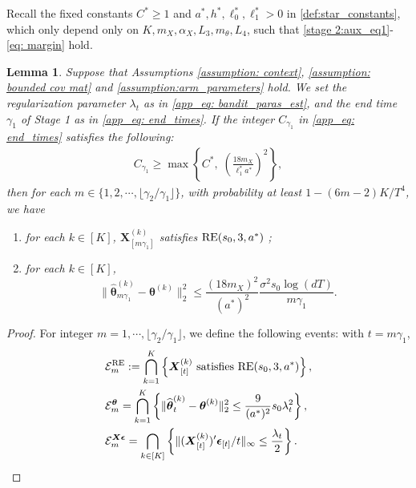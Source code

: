 \documentclass[aos,preprint]{imsart}
\theoremstyle{plain}
\newtheorem{lemma}[theorem]{Lemma}
\theoremstyle{definition}
\newcommand{\btheta}{\boldsymbol{\theta}}
\newcommand{\bd}[1]{\boldsymbol{#1}}
\newcommand{\hbtheta}{\widehat{\boldsymbol{\theta}}}
\newcommand{\bX}{\boldsymbol{X}}
\newcommand{\mE}{\mathcal{E}}
\newcommand{\bepsilon}{\bd{\epsilon}}
\begin{document}
\begin{appendix}
Recall the fixed constants  $C^* \geq 1$ and $a^*, h^*, \ell_0^*, \ell_1^* > 0$  in \eqref{def:star_constants}, which only depend only on $K,  m_X, \alpha_X,  L_3, m_{\theta}, L_4$, such that \eqref{stage 2:aux_eq1}-\eqref{eq: margin} hold.

\begin{lemma} \label{lemma: RE and estimation error of stage 2}
Suppose that Assumptions \ref{assumption: context}, \ref{assumption: bounded cov mat} and \ref{assumption:arm_parameters} hold. We set the regularization parameter $\lambda_t$ as in \eqref{app_eq: bandit_paras_est}, and the end time $\gamma_1$ of Stage 1 as in \eqref{app_eq: end_times}.
If the integer $C_{\gamma_1}$ in \eqref{app_eq: end_times} satisfies the following:
\begin{align}
    \label{eq: lambda_gamma_1}
     C_{\gamma_1} \ge \max\left\{C^*,\; \left(\frac{18m_X}{\ell_1^* a^*}\right)^2\right\},
\end{align}
then for each  $m \in \{1,2,\cdots,\lfloor \gamma_2/\gamma_1 \rfloor\}$, with probability at least $1-(6m-2)K/T^4$, we have
\begin{enumerate}[label=\roman*)]
    \item for each $k \in [K]$, $\bX_{[m\gamma_1]}^{(k)}$ satisfies $\textup{RE}(s_0,3,a^*)$ ;
    \item for each $k \in [K]$,
    $$
    \|\hbtheta_{m\gamma_1}^{(k)}-\btheta^{(k)}\|_2^2\le   \frac{(18m_{X})^2}{(a^*)^2}  \frac{\sigma^2 s_0\log (dT)}{m\gamma_1}.
    $$
\end{enumerate}
\end{lemma}

\begin{proof}
For integer $m=1, \cdots,\lfloor \gamma_2/\gamma_1\rfloor$, we define the  following events:  with $t = m\gamma_1$, 
\begin{align}\label{def:stage2_events}
\begin{split}
&  \mE_m^{\textup{RE}} := \bigcap_{k = 1}^{K} \left\{\bX_{[t]}^{(k)} \textup{ satisfies } \textup{RE}(s_0,3, a^*)\right\}, \\
&\mE_m^{\btheta} = \bigcap_{k = 1}^{K}\left\{\|\hbtheta_t^{(k)}-\btheta^{(k)}\|_2^2 \le \frac{9}{(a^*)^2}s_0\lambda_t^2\right\},    \\
&\mE_m^{\bX\bepsilon} = \bigcap_{k\in [K]} \left\{\|{(\bX_{[t]}^{(k)}})' \bepsilon_{[t]}/t\|_{\infty} 
\le \frac{\lambda_t}{2} \right\}.
\end{split}
\end{align}


\end{proof}
\end{appendix}
\end{document}
